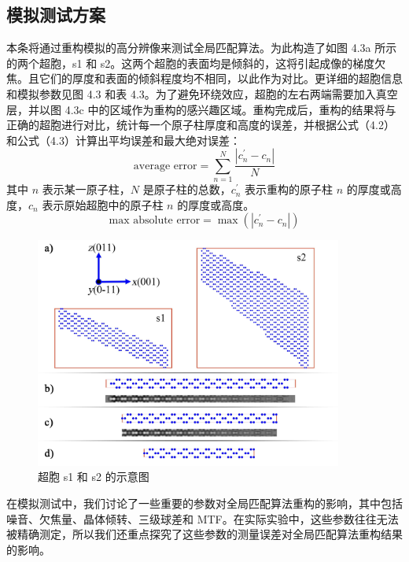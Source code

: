 \subsection{模拟测试方案}
本条将通过重构模拟的高分辨像来测试全局匹配算法。为此构造了如图 4.3a 所示的两个超胞，s1 和 s2。这两个超胞的表面均是倾斜的，这将引起成像的梯度欠焦。且它们的厚度和表面的倾斜程度均不相同，以此作为对比。更详细的超胞信息和模拟参数见图 4.3 和表 4.3。为了避免环绕效应，超胞的左右两端需要加入真空层，并以图 4.3c 中的区域作为重构的感兴趣区域。重构完成后，重构的结果将与正确的超胞进行对比，统计每一个原子柱厚度和高度的误差，并根据公式（4.2）和公式（4.3）计算出平均误差和最大绝对误差：
\begin{equation}
\text{average error} = \sum_{n=1}^N \frac{\left|c_n^{\prime}-c_n\right|}{N}
\end{equation}
其中 $n$ 表示某一原子柱，$N$ 是原子柱的总数，$c_n^{\prime}$ 表示重构的原子柱 $n$ 的厚度或高度，$c_n$ 表示原始超胞中的原子柱 $n$ 的厚度或高度。
\begin{equation}
\text{max absolute error}=\max \left(\left|c_n^{\prime}-c_n\right|\right)
\end{equation}
\begin{figure}[htbp]
	\vspace{\baselineskip}
	\centering
	\includegraphics[width=0.9\textwidth]{../2.2/22}
	\caption{超胞 s1 和 s2 的示意图}\label{fig:22}
	\song{}
\end{figure}

在模拟测试中，我们讨论了一些重要的参数对全局匹配算法重构的影响，其中包括噪音、欠焦量、晶体倾转、三级球差和 MTF。在实际实验中，这些参数往往无法被精确测定，所以我们还重点探究了这些参数的测量误差对全局匹配算法重构结果的影响。

